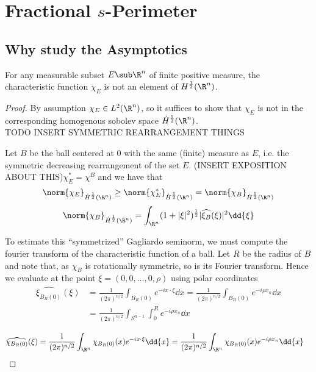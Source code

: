 \documentclass[../main.tex]{subfiles}
\begin{document}
\section{Fractional $s$-Perimeter}

\subsection{Why study the Asymptotics}

\begin{fact}
    For any measurable subset $ E\sub \R^{n} $ of finite positive measure, the characteristic function $ \chi_{E} $ is not an element of $ H^{\frac{1}{2}}(\R^{n}) $.
\end{fact}

\begin{proof}
    By assumption $ \chi_{E}\in L^{2}(\R^{n})$, so it suffices to show that $ \chi_{E} $ is not in the corresponding homogenous sobolev space $ \dot H^{\frac{1}{2}}(\R^{n}) $. \\  

    TODO INSERT SYMMETRIC REARRANGEMENT THINGS

    Let $ B $ be the ball centered at $ 0 $ with the same (finite) measure as $ E $, i.e. the symmetric decreasing rearrangement of the set $ E $. (INSERT EXPOSITION ABOUT THIS)$ \chi_{E}^{*} = \chi^{B} $ and we have that 
    \[
        \norm{\chi_{E}}_{\dot H^{\frac{1}{2}}(\R^{n})} \geq \norm{\chi_{E}^{*}}_{\dot H^{\frac{1}{2}}(\R^{n})} = \norm{\chi_{B}}_{\dot H^{\frac{1}{2}}(\R^{n})}
    \]
    \begin{align*}
        \norm{\chi_{B}}_{\dot H^{\frac{1}{2}}(\R^{n})} = \int_{\R^{n}} (1+| \xi|^{2})^{\frac{1}{2}}| \widehat{\xi_{B}}(\xi)|^{2} \dd{\xi}
    \end{align*}

    To estimate this ``symmetrized'' Gagliardo seminorm, we must compute the fourier transform of the characteristic function of a ball. Let $ R $ be the radius of $ B $ and note that, as $ \chi_{B} $ is rotationally symmetric, so is its Fourier transform. Hence we evaluate at the point $ \xi = (0,0,\ldots, 0, \rho) $ using polar coordinates
    \begin{align*}
        \widehat{\xi_{B_{R}(0)}}(\xi) &= \frac{1}{(2\pi)^{n/2}}\int_{B_{R}(0)} e^{-i x\cdot \xi} \dd{x} = \frac{1}{(2\pi)^{n/2}}\int_{B_{R}(0)} e^{-i \rho x_{n} } \dd{x} \\
        &=  \frac{1}{(2\pi)^{n/2}}\int_{S^{n-1}}\int_0^{R} e^{-i \rho x_{n} } \dd{x} 
    \end{align*}

    \begin{align*}
        \widehat{\chi_{B_{R}(0)}}(\xi) &= \frac{1}{(2\pi)^{n/2}}\int_{\R^{n}} \chi_{B_{R}(0)}(x) e^{-i x\cdot \xi} \dd{x} = \frac{1}{(2\pi)^{n/2}}\int_{\R^{n}} \chi_{B_{R}(0)}(x) e^{-i \rho x_{n}} \dd{x}  
    \end{align*}
\end{proof}
\end{document}
